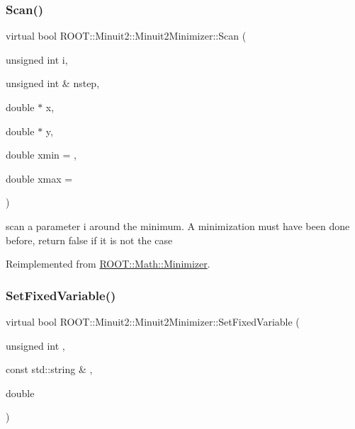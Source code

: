 \subsubsection{\texorpdfstring{Scan()}{Scan()}\hspace{0.1cm}{\footnotesize\ttfamily [3/3]}}
{\footnotesize\ttfamily virtual bool R\+O\+O\+T\+::\+Minuit2\+::\+Minuit2\+Minimizer\+::\+Scan (\begin{DoxyParamCaption}\item[{unsigned int}]{i,  }\item[{unsigned int \&}]{nstep,  }\item[{double $\ast$}]{x,  }\item[{double $\ast$}]{y,  }\item[{double}]{xmin = {},  }\item[{double}]{xmax = {} }\end{DoxyParamCaption})\hspace{0.3cm}{\ttfamily [virtual]}}

scan a parameter i around the minimum. A minimization must have been done before, return false if it is not the case 

Reimplemented from \mbox{\hyperlink{classROOT_1_1Math_1_1Minimizer_a1e6e4b32d7338a7a08791cff67f54080}{R\+O\+O\+T\+::\+Math\+::\+Minimizer}}.

\mbox{\label{classROOT_1_1Minuit2_1_1Minuit2Minimizer_af42341b80ebb02d8c0882beaa781e7bd}} 
\subsubsection{\texorpdfstring{SetFixedVariable()}{SetFixedVariable()}\hspace{0.1cm}{\footnotesize\ttfamily [1/3]}}
{\footnotesize\ttfamily virtual bool R\+O\+O\+T\+::\+Minuit2\+::\+Minuit2\+Minimizer\+::\+Set\+Fixed\+Variable (\begin{DoxyParamCaption}\item[{unsigned int}]{,  }\item[{const std\+::string \&}]{,  }\item[{double}]{ }\end{DoxyParamCaption})\hspace{0.3cm}{\ttfamily [virtual]}}



